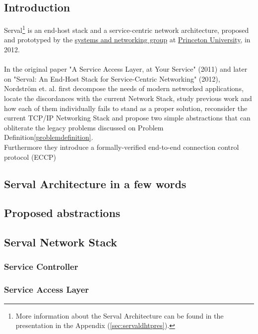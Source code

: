 \subsection{Introduction}
Serval\footnote{More information about the Serval Architecture can be found in the presentation in the Appendix (\ref{sec:servaldhtpres}).} is an end-host stack and a service-centric network architecture, proposed and prototyped by the \href{https://sns.cs.princeton.edu/}{systems and networking group} at \href{https://www.princeton.edu}{Princeton University}, in 2012.

\paragraph{} In the original paper "A Service Access Layer, at Your Service" (2011)\cite{Freedman2011} and later on "Serval: An End-Host Stack for Service-Centric Networking" (2012)\cite{Nordstrom2012}, Nordstr{\"o}m et. al. first decompose the needs of modern networked applications, locate the discordances with the current Network Stack, study previous work and how each of them individually fails to stand as a proper solution, reconsider the current TCP/IP Networking Stack and propose two simple abstractions that can obliterate the legacy problems discussed on Problem Definition\ref{problemdefinition}.\\
\indent Furthermore they introduce a formally-verified end-to-end connection control protocol (ECCP) 

\subsection{Serval Architecture in a few words}


\subsection{Proposed abstractions}



\subsection{Serval Network Stack}
\subsubsection{Service Controller}
\subsubsection{Service Access Layer}
